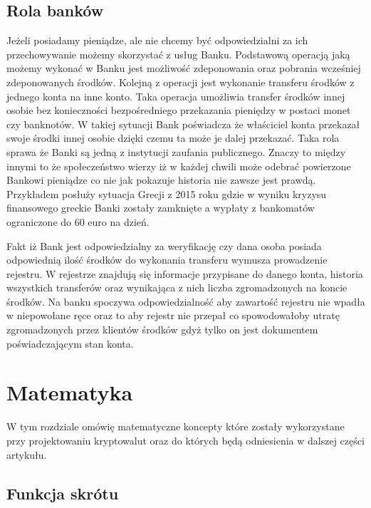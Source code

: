 \documentclass[conference]{IEEEtran}
\begin{document}

\subsection{Rola banków}

Jeżeli posiadamy pieniądze, ale nie chcemy być odpowiedzialni za ich przechowywanie możemy skorzystać z usług Banku.
Podstawową operacją jaką możemy wykonać w Banku jest możliwość zdeponowania oraz pobrania wcześniej zdeponowanych
środków. Kolejną z operacji jest wykonanie transferu środków z jednego konta na inne konto. Taka operacja umożliwia
transfer środków innej osobie bez konieczności bezpośredniego przekazania pieniędzy w postaci monet czy banknotów. W
takiej sytuacji Bank poświadcza że właściciel konta przekazał swoje środki innej osobie dzięki czemu ta może je dalej
przekazać. Taka rola sprawa że Banki są jedną z instytucji zaufania publicznego. Znaczy to między innymi to że
społeczeństwo wierzy iż w każdej chwili może odebrać powierzone Bankowi pieniądze co nie jak pokazuje historia nie
zawsze jest prawdą. Przykładem posłuży sytuacja Grecji z 2015 roku gdzie w wyniku kryzysu finansowego greckie Banki
zostały zamknięte a wypłaty z bankomatów ograniczone do 60 euro na dzień.\cite{kryzysGrecji}

Fakt iż Bank jest odpowiedzialny za weryfikację czy dana osoba posiada odpowiednią ilość środków do wykonania transferu
wymusza prowadzenie rejestru. W rejestrze znajdują się informacje przypisane do danego konta, historia wszystkich
transferów oraz wynikająca z nich liczba zgromadzonych na koncie środków. Na banku spoczywa odpowiedzialność aby
zawartość rejestru nie wpadła w niepowołane ręce oraz to aby rejestr nie przepał co spowodowałoby utratę zgromadzonych
przez klientów środków gdyż tylko on jest dokumentem poświadczającym stan konta.

\section{Matematyka}

W tym rozdziale omówię matematyczne koncepty które zostały wykorzystane przy projektowaniu kryptowalut oraz do których
będą odniesienia w dalszej części artykułu.

\subsection{Funkcja skrótu}
\end{document}
